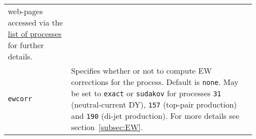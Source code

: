\begin{longtable}{p{1.5cm}p{12cm}}
                web-pages accessed via the \href{\mcfmprocs/proclist.html}{list of processes}
                for further details. \\
		\texttt{ewcorr} & 
		Specifies whether or not to compute EW corrections
		for the process.  Default is {\tt none}.  May be set to {\tt exact}
		or {\tt sudakov} for processes {\tt 31} (neutral-current DY),
		{\tt 157} (top-pair production) and {\tt 190} (di-jet production).
		For more details see section~\ref{subsec:EW}.		\\
		\hline
	\end{longtable}
